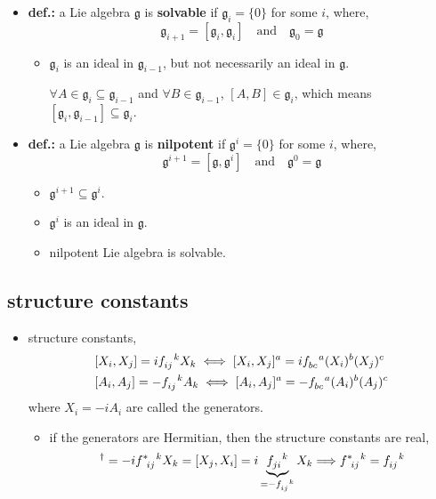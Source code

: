 \begin{itemize}
	\item \textbf{def.:} a Lie algebra $\mathfrak{g}$ is \textbf{solvable} if $\mathfrak{g}_i = \{0\}$ for some $i$, where,
	\begin{equation}
		\mathfrak{g}_{i + 1} = [\mathfrak{g}_i, \mathfrak{g}_i] \quad \text{and} \quad \mathfrak{g}_0 = \mathfrak{g}
	\end{equation}
	\begin{itemize}
		\item $\mathfrak{g}_i$ is an ideal in $\mathfrak{g}_{i - 1}$, but not necessarily an ideal in $\mathfrak{g}$.
		
		\begin{tcolorbox}[title=proof:]
			$\forall A \in \mathfrak{g}_i \subseteq \mathfrak{g}_{i - 1}$ and $\forall B \in \mathfrak{g}_{i - 1}$, $[A, B] \in \mathfrak{g}_i$, which means $[\mathfrak{g}_i, \mathfrak{g}_{i - 1}] \subseteq \mathfrak{g}_i$.
		\end{tcolorbox}
	\end{itemize}
	
	\item \textbf{def.:} a Lie algebra $\mathfrak{g}$ is \textbf{nilpotent} if $\mathfrak{g}^i = \{0\}$ for some $i$, where,
	\begin{equation}
		\mathfrak{g}^{i + 1} = [\mathfrak{g}, \mathfrak{g}^i] \quad \text{and} \quad \mathfrak{g}^0 = \mathfrak{g}
	\end{equation}
	\begin{itemize}
		\item $\mathfrak{g}^{i + 1} \subseteq \mathfrak{g}^i$.
		
		\item $\mathfrak{g}^i$ is an ideal in $\mathfrak{g}$.
		
		\item nilpotent Lie algebra is solvable.
	\end{itemize}
\end{itemize}

\subsection{structure constants}
\begin{itemize}
	\item structure constants,
	\begin{align}
		& [X_i, X_j] = i \tensor{f}{_{i j}^k} X_k \iff [X_i, X_j]^a = i \tensor{f}{_{b c}^a} (X_i)^b (X_j)^c \\
		& [A_i, A_j] = - \tensor{f}{_{i j}^k} A_k \iff [A_i, A_j]^a = - \tensor{f}{_{b c}^a} (A_i)^b (A_j)^c
	\end{align}
	where $X_i = - i A_i$ are called the generators.
	\begin{itemize}
		\item if the generators are Hermitian, then the structure constants are real,
		\begin{equation}
			[X_i, X_j]^\dag = - i \tensor{f}{^*_{i j}^k} X_k = [X_j, X_i] = i \underbrace{\tensor{f}{_{j i}^k}}_{= - \tensor{f}{_{i j}^k}} X_k \Longrightarrow \tensor{f}{^*_{i j}^k} = \tensor{f}{_{i j}^k}
		\end{equation}
	\end{itemize}
\end{itemize}
